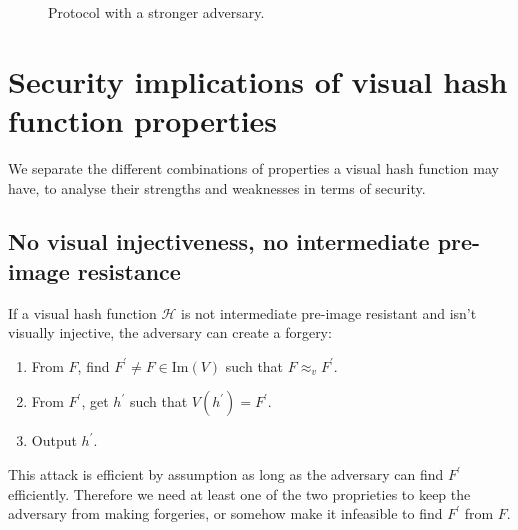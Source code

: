 \documentclass{article}
\newcommand{\vis}{\approx_v}
\newcommand{\hh}{\mathcal H}
\begin{document}
\begin{figure}[h]
    \centering
    \caption{Protocol with a stronger adversary.}
    \label{fig:front_adv}
\end{figure}


\section{Security implications of visual hash function properties}
We separate the different combinations of properties a visual hash function may have, to analyse their strengths and weaknesses in terms of security.
 \subsection{No visual injectiveness, no intermediate pre-image resistance}
\label{section:forge}
If a visual hash function $\hh$ is not intermediate pre-image resistant and isn't visually injective, the adversary can create a forgery:

\begin{enumerate}
    \item From $F$, find $F^\prime \neq F \in \text{Im}(V)$ such that $F \vis F^\prime$.
    \item From $F^\prime$, get $h^\prime$ such that $V(h^\prime) = F^\prime$.
    \item Output $h^\prime$.
\end{enumerate}
This attack is efficient by assumption as long as the adversary can find $F^\prime$ efficiently. Therefore we need at least one of the two proprieties to keep the adversary from making forgeries, or somehow make it infeasible to find $F^\prime$ from $F$.
\end{document}
